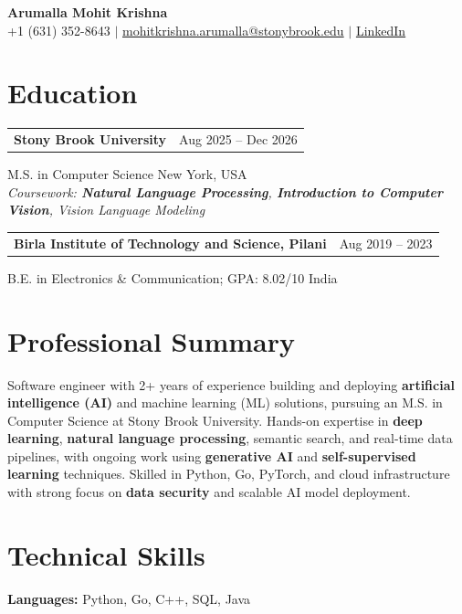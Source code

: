 \documentclass[letterpaper,10pt]{article}
\makeatletter
\newcommand{\entry}[2]{%
  \noindent
  \begin{tabularx}{\linewidth}
    {@{}>{\raggedright\arraybackslash}X@{\hspace{6pt}}r@{}}
    \textbf{#1} & #2
  \end{tabularx}\par
}
\makeatother
\begin{document}
\begin{center}
    {\LARGE\bfseries Arumalla Mohit Krishna}\\[3pt]
    +1 (631) 352-8643 $|$
    \href{mailto:mohitkrishna.arumalla@stonybrook.edu}
    {mohitkrishna.arumalla@stonybrook.edu} $|$
    \href{https://linkedin.com/in/mohit-krishna-arumalla}
    {LinkedIn}
\end{center}
\vspace{-8pt}

\section{Education}

\entry
  {\textbf{Stony Brook University}}
  {Aug 2025 -- Dec 2026}

M.S. in Computer Science \hfill New York, USA\\
\textit{
Coursework: \textbf{Natural Language Processing}, 
\textbf{Introduction to Computer Vision}, Vision Language Modeling
}
\vspace{3pt}

\entry
  {\textbf{Birla Institute of Technology and Science, Pilani}}
  {Aug 2019 -- 2023}

B.E. in Electronics \& Communication; GPA: 8.02/10 \hfill India
\section{Professional Summary}

Software engineer with 2+ years of experience building and deploying \textbf{artificial intelligence (AI)} and machine learning (ML) solutions, pursuing an M.S. in Computer Science at Stony Brook University. Hands-on expertise in \textbf{deep learning}, \textbf{natural language processing}, semantic search, and real-time data pipelines, with ongoing work using \textbf{generative AI} and \textbf{self-supervised learning} techniques. Skilled in Python, Go, PyTorch, and cloud infrastructure with strong focus on \textbf{data security} and scalable AI model deployment.
\section{Technical Skills}

\textbf{Languages:}
Python, Go, C++, SQL, Java\\
\end{document}
